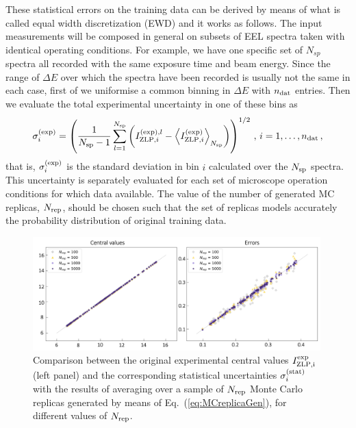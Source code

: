 These statistical errors on the training data can be derived by means of what is called
equal width discretization (EWD) and it works as follows.
%
The input measurements will be composed in general on subsets of EEL
spectra taken with identical operating conditions.
%
For example, we have one specific set of $N_{sp}$ spectra all recorded with 
the same exposure time and beam energy. 
%
Since the range of $\Delta E$ over which the spectra have been recorded
is usually not the same in each case, first of 
we uniformise a common binning in $\Delta E$ with $n_{\rm dat}$ entries.
%
Then we evaluate the total experimental uncertainty in one of these bins as
\begin{equation}
\label{eq:sigmaiexp}
\sigma_i^{\rm (exp)} = \left( {{1}\over {N_{\rm sp}-1}} \sum_{l=1}^{N_{\rm sp}}
\left( I_{{\rm ZLP},i}^{ ({\rm exp}),l}  - \left\langle I_{{\rm ZLP},i}^{ ({\rm exp})}\right\rangle_{N_{\rm sp}} \right) \right)^{1/2} \, ,\,
i=1,\ldots, n_{\rm dat} \, ,
\end{equation}
that is, $\sigma_i^{\rm (exp)}$ is the standard deviation in bin $i$ calculated over the $N_{\rm sp}$ spectra.
%
This uncertainty is separately evaluated for each set of microscope operation conditions
for which data available.
%
The value of the number of generated MC replicas, $N_{\rm rep}$, should be chosen such that the set of replicas 
models accurately the probability distribution of original training data.
%
\begin{figure}[t]
    \centering
    \includegraphics[width=0.99\textwidth]{plots/MC-Copy1.pdf}
    \caption{Comparison between the original experimental central values
      $I_{\rm ZLP,i}^{\rm exp}$ (left panel) and the corresponding statistical
      uncertainties $\sigma_i^{(\rm stat)}$ with the results of averaging over
      a sample of $N_{\rm rep}$ Monte Carlo replicas generated by means of
      Eq.~(\ref{eq:MCreplicaGen}), for different values of
      $N_{\rm rep}$.
      }
    \label{fig:MC}
\end{figure}

